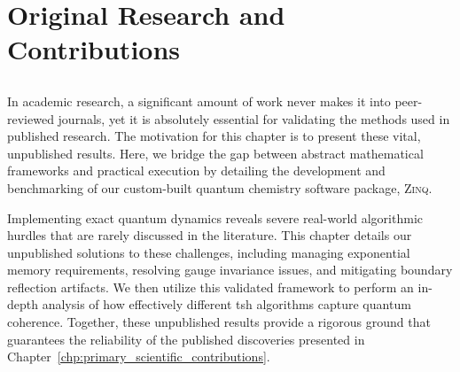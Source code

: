 \part{Original Research and Contributions}
\chapter{\foldertotitle}\label{chp:supporting_numerical_studies}
In academic research, a significant amount of work never makes it into peer-reviewed journals, yet it is absolutely essential for validating the methods used in published research. The motivation for this chapter is to present these vital, unpublished results. Here, we bridge the gap between abstract mathematical frameworks and practical execution by detailing the development and benchmarking of our custom-built quantum chemistry software package, \textsc{Zinq}.\supercite{10.5281/zenodo.18386143}

Implementing exact quantum dynamics reveals severe real-world algorithmic hurdles that are rarely discussed in the literature. This chapter details our unpublished solutions to these challenges, including managing exponential memory requirements, resolving gauge invariance issues, and mitigating boundary reflection artifacts. We then utilize this validated framework to perform an in-depth analysis of how effectively different \acrfull{tsh} algorithms capture quantum coherence. Together, these unpublished results provide a rigorous ground that guarantees the reliability of the published discoveries presented in Chapter~\ref{chp:primary_scientific_contributions}.
